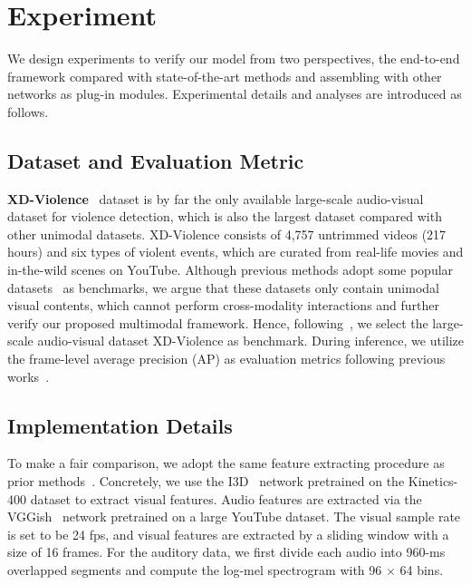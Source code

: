 \documentclass[sigconf]{acmart}
\begin{document}
\section{Experiment}
We design experiments to verify our model from two perspectives, the end-to-end framework compared with state-of-the-art methods and assembling with other networks as plug-in modules. Experimental details and analyses are introduced as follows.

\subsection{Dataset and Evaluation Metric}

\textbf{XD-Violence}~\cite{wu2020not} dataset is by far the only available large-scale audio-visual dataset for violence detection, which is also the largest dataset compared with other unimodal datasets. XD-Violence consists of 4,757 untrimmed videos (217 hours) and six types of violent events, which are curated from real-life movies and in-the-wild scenes on YouTube. Although previous methods adopt some popular datasets~\cite{sultani2018real, liu2018future} as benchmarks, we argue that these datasets only contain unimodal visual contents, which cannot perform cross-modality interactions and further verify our proposed multimodal framework. Hence, following~\cite{wu2020not, pang2021violence}, we select the large-scale audio-visual dataset XD-Violence as benchmark. During inference, we utilize the frame-level average precision (AP) as evaluation metrics following previous works~\cite{wu2020not, pang2021violence, tian2021weakly}.

\subsection{Implementation Details}

To make a fair comparison, we adopt the same feature extracting procedure as prior methods~\cite{wu2020not, pang2021violence, wu2021learning, tian2021weakly}. Concretely, we use the I3D~\cite{carreira2017quo} network pretrained on the Kinetics-400 dataset to extract visual features. Audio features are extracted via the VGGish~\cite{gemmeke2017audio, hershey2017cnn} network pretrained on a large YouTube dataset. The visual sample rate is set to be 24 fps, and visual features are extracted by a sliding window with a size of 16 frames. For the auditory data, we first divide each audio into 960-ms overlapped segments and compute the log-mel spectrogram with 96 $\times$ 64 bins. 
\end{document}
